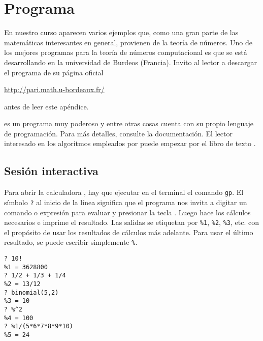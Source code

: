 \chapter{Programa \gp}

\ifdefined\separatechapter\bookbanner\fi


\vspace{1em}

En nuestro curso aparecen varios ejemplos que, como una gran parte de las
matemáticas interesantes en general, provienen de la teoría de números. Uno de
los mejores programas para la teoría de números computacional es \gp{} que se
está desarrollando en la universidad de Burdeos (Francia). Invito al lector a
descargar el programa de su página oficial
\begin{center}
  \url{http://pari.math.u-bordeaux.fr/}
\end{center}
antes de leer este apéndice.

\gp{} es un programa muy poderoso y entre otras cosas cuenta con su propio
lenguaje de programación. Para más detalles, consulte la documentación.
El lector interesado en los algoritmos empleados por \gp{} puede empezar por
el libro de texto \cite{Cohen-GTM-138}.


\section{Sesión interactiva}

Para abrir la calculadora \gp, hay que ejecutar en el terminal el comando
\texttt{gp}. El símbolo \texttt{?} al inicio de la línea significa que
el programa nos invita a digitar un comando o expresión para evaluar y presionar
la tecla . Luego \gp{} hace los cálculos necesarios e
imprime el resultado. Las salidas se etiquetan por \texttt{\%1}, \texttt{\%2},
\texttt{\%3}, etc. con el propósito de usar los resultados de cálculos más
adelante. Para usar el último resultado, se puede escribir simplemente
\texttt{\%}.

\begin{framed}\footnotesize
\begin{verbatim}
? 10!
%1 = 3628800
? 1/2 + 1/3 + 1/4
%2 = 13/12
? binomial(5,2)
%3 = 10
? %^2
%4 = 100
? %1/(5*6*7*8*9*10)
%5 = 24
\end{verbatim}
\end{framed}

